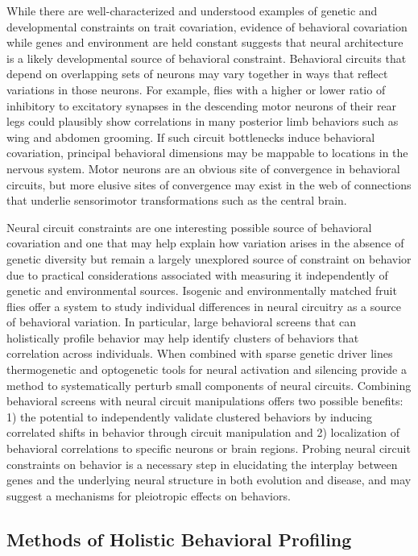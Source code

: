 \documentclass[12pt,letterpaper]{article}
\begin{document}
While there are well-characterized and understood examples of genetic and developmental constraints on trait covariation, evidence of behavioral covariation while genes and environment are held constant suggests that neural architecture is a likely developmental source of behavioral constraint. Behavioral circuits that depend on overlapping sets of neurons may vary together in ways that reﬂect variations in those neurons. For example, ﬂies with a higher or lower ratio of inhibitory to excitatory synapses in the descending motor neurons of their rear legs could plausibly show correlations in many posterior limb behaviors such as wing and abdomen grooming. If such circuit bottlenecks induce behavioral covariation, principal behavioral dimensions may be mappable to locations in the nervous system. Motor neurons are an obvious site of convergence in behavioral circuits, but more elusive sites of convergence may exist in the web of connections that underlie sensorimotor transformations such as the central brain.

Neural circuit constraints are one interesting possible source of behavioral covariation and one that may help explain how variation arises in the absence of genetic diversity but remain a largely unexplored source of constraint on behavior due to practical considerations associated with measuring it independently of genetic and environmental sources. Isogenic and environmentally matched fruit flies offer a system to study individual differences in neural circuitry as a source of behavioral variation. In particular, large behavioral screens that can holistically profile behavior may help identify clusters of behaviors that correlation across individuals. When combined with sparse genetic driver lines thermogenetic and optogenetic tools for neural activation and silencing provide a method to systematically perturb small components of neural circuits. Combining behavioral screens with neural circuit manipulations offers two possible benefits: 1) the potential to independently validate clustered behaviors by inducing correlated shifts in behavior through circuit manipulation and 2) localization of behavioral correlations to specific neurons or brain regions. Probing neural circuit constraints on behavior is a necessary step in elucidating the interplay between genes and the underlying neural structure in both evolution and disease, and may suggest a mechanisms for pleiotropic effects on behaviors.

\subsection{Methods of Holistic Behavioral Profiling}
\end{document}
